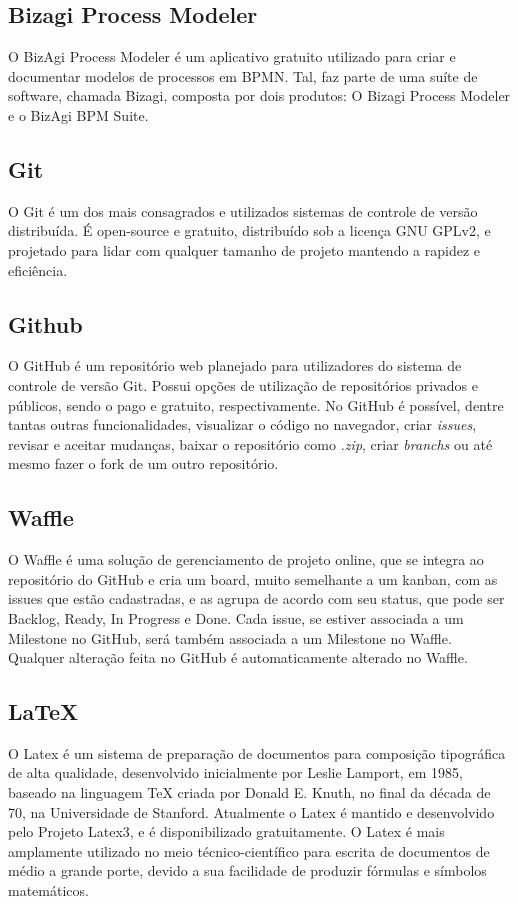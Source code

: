 \subsection{Bizagi Process Modeler}
O BizAgi Process Modeler é um aplicativo gratuito utilizado para criar e documentar modelos de processos em BPMN. Tal, faz parte de uma suíte de software, chamada Bizagi, composta por dois produtos: O Bizagi Process Modeler e o BizAgi BPM Suite. 

\subsection{Git}
O Git é um dos mais consagrados e utilizados sistemas de controle de versão distribuída. É open-source e gratuito, distribuído sob a licença GNU GPLv2, e projetado para lidar com qualquer tamanho de projeto mantendo a rapidez e eficiência. 

\subsection{Github}
O GitHub é um repositório web planejado para utilizadores do sistema de controle de versão Git. Possui opções de utilização de repositórios privados e públicos, sendo o pago e gratuito, respectivamente.
No GitHub é possível, dentre tantas outras funcionalidades, visualizar o código no navegador, criar \textit{issues}, revisar e aceitar mudanças, baixar o repositório como \textit{.zip}, criar \textit{branchs} ou até mesmo fazer o fork de um outro repositório.

\subsection{Waffle}
O Waffle é uma solução de gerenciamento de projeto online, que se integra ao repositório do GitHub e cria um board, muito semelhante a um kanban, com as issues que estão cadastradas, e as agrupa de acordo com seu status, que pode ser Backlog, Ready, In Progress  e Done. Cada issue, se estiver associada a um Milestone no GitHub, será também associada a um Milestone no Waffle. Qualquer alteração feita no GitHub é automaticamente alterado no Waffle.

\subsection{LaTeX}
O Latex é um sistema de preparação de documentos para composição tipográfica de alta qualidade, desenvolvido inicialmente por Leslie Lamport, em 1985, baseado na linguagem TeX criada por Donald E. Knuth, no final da década de 70, na Universidade de Stanford. Atualmente o Latex é mantido e desenvolvido pelo Projeto Latex3, e é disponibilizado gratuitamente.
O Latex é mais amplamente utilizado no meio técnico-científico para escrita de documentos de médio a grande porte, devido a sua facilidade de produzir fórmulas e símbolos matemáticos. 

